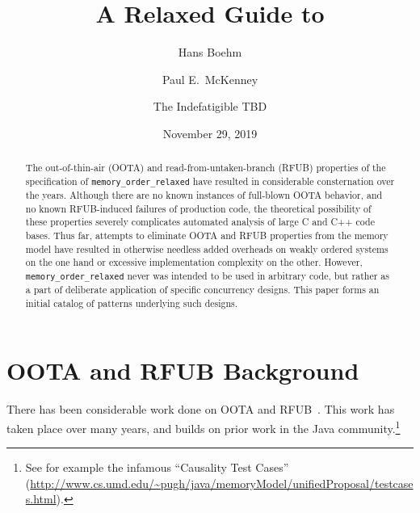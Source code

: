 \documentclass[10]{article}
\begin{document}
\title{A Relaxed Guide to }

\newcommand{\co}[1]{\lstinline[breaklines=yes,breakatwhitespace=yes]{#1}}

\author{
Hans Boehm\\ \and
Paul E.~McKenney\\ \and
The Indefatigible TBD
}
\date{November 29, 2019}
\maketitle{}

\begin{abstract}
	The out-of-thin-air (OOTA) and read-from-untaken-branch (RFUB)
	properties of the specification of \co{memory_order_relaxed}
	have resulted in considerable consternation over the years.
	Although there are no known instances of full-blown OOTA
	behavior, and no known RFUB-induced failures of production code,
	the theoretical possibility of these properties severely
	complicates automated analysis of large C and C++ code bases.
	Thus far, attempts to eliminate OOTA and RFUB properties from
	the memory model have resulted in otherwise needless added
	overheads on weakly ordered systems on the one hand or
	excessive implementation complexity on the other.
	However, \co{memory_order_relaxed} never was intended to be used
	in arbitrary code, but rather as a part of deliberate application
	of specific concurrency designs.
	This paper forms an initial catalog of patterns underlying such
	designs.
\end{abstract}

\section{OOTA and RFUB Background}
\label{sec:OOTA and RFUB Background}

There has been considerable work done on OOTA and
RFUB~\cite{Boehm:2014:OGA:2618128.2618134,PaulEMcKenney2016OOTA,Lahav:2017:RSC:3062341.3062352,Sinclair:2017:CAR:3079856.3080206,HansBoehm2019OOTArevisitedAgain,MarkBatty2019ModularRelaxedDependenciesOOTA}.
This work has taken place over many years, and builds on prior work
in the Java community.\footnote{
	See for example the infamous ``Causality Test Cases''
	(\url{http://www.cs.umd.edu/~pugh/java/memoryModel/unifiedProposal/testcases.html}).}
\end{document}
